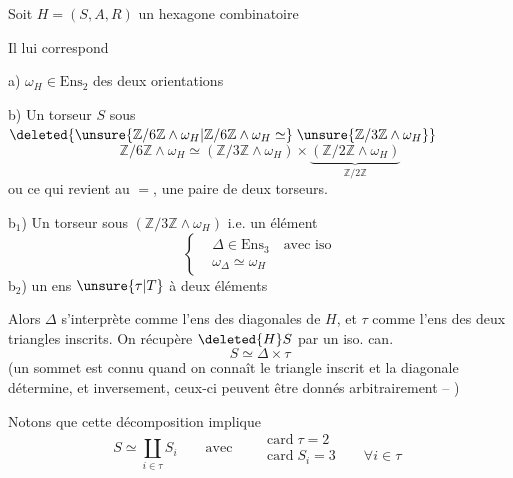 Soit $H=(S,A,R)$ un hexagone combinatoire


Il lui correspond

a) $\omega_H\in\mathrm{Ens}_2$  des deux orientations

b) Un torseur $S$ sous $\deleted{\unsure{\mathbb Z/6\mathbb Z\wedge\omega_H|\mathbb Z/6\mathbb Z\wedge\omega_H\simeq}\;\unsure{\mathbb Z/3\mathbb Z\wedge\omega_H}}$
\[
\mathbb Z/6\mathbb Z\wedge\omega_H \simeq
(\mathbb Z/3\mathbb Z\wedge\omega_H)\times
\underbrace{(\mathbb Z/2\mathbb Z\wedge\omega_H)}_{\mathbb Z/2\mathbb Z}
\]
ou ce qui revient au $=$, une paire de deux torseurs.

b$_1$) Un torseur sous $(\mathbb Z/3\mathbb Z\wedge\omega_H)$ i.e. un  élément
\[
\left\{\begin{aligned}
&\Delta\in\mathrm{Ens}_3\quad\text{avec iso}\\
&\omega_\Delta\simeq\omega_H
\end{aligned}\right.
\]
b$_2$) un ens $\unsure{\tau|T}$ à deux éléments

Alors $\Delta$ s'interprète comme l'ens des  diagonales\unsure{,} de $H$, et $\tau$ comme l'ens des deux triangles inscrits. On récupère $\deleted{H}S$ par un iso. can.
\[
S\simeq\Delta\times\tau
\]
(un sommet est connu quand on connaît le triangle inscrit et la diagonale  détermine, et inversement, ceux-ci peuvent être donnés arbitrairement -- )

Notons que cette décomposition implique
\[
S\simeq\coprod_{i\in\tau}S_i\qquad\text{avec}\quad
\begin{aligned}
&\operatorname{card}\tau=2\\
&\operatorname{card}S_i=3\qquad\forall i\in\tau
\end{aligned}
\]


